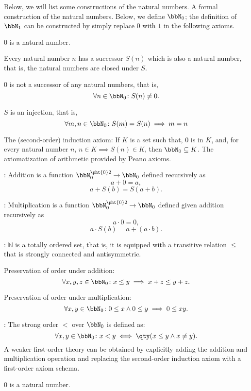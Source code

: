 \documentclass[a4paper,12pt]{report}
\begin{document}
\begin{itemizle}
Below, we will list some constructions of the natural numbers.
A formal construction of the natural numbers. Below, we define $\bbN_0$; the definition of $\bbN_1$ can be constructed by simply replace $0$ with $1$ in the following axioms.
\bit
\item $0$ is a natural number.
\item Every natural number $n$ has a successor $S(n)$ which is also a natural number, that is, the natural numbers are closed under $S$.
\item $0$ is not a successor of any natural numbers, that is,
\[\forall n\in\bbN_0\colon S(n)\neq 0.\]
\item $S$ is an injection, that is,
\[\forall m,n\in\bbN_0\colon S(m)=S(n)\implies m=n\]
\eit
\item The (second-order) induction axiom: If $K$ is a set such that, $0$ is in $K$, and, for every natural number $n$, $n\in K\implies S(n)\in K$, then $\bbN_0\subseteq K$.
\eit
{}
The axiomatization of arithmetic provided by Peano axioms.
\bit
\item {}: Addition is a function $\bbN_0^{\pht{0}2}\to\bbN_0$ defined recursively as
\[a+0=a,\]
\[a+S(b)=S(a+b).\]
\item {}: Multiplication is a function $\bbN_0^{\pht{0}2}\to\bbN_0$ defined given addition recursively as
\[a\cdot 0=0,\]
\[a\cdot S(b)=a+(a\cdot b).\]
\item {}: $\mathbb{N}$ is a totally ordered set, that is, it is equipped with a transitive relation $\leq$ that is strongly connected and antisymmetric.
\bit
\item Preservation of order under addition:
\[\forall x,y,z\in\bbN_0\colon x\leq y\implies x+z\leq y+z.\]
\item Preservation of order under multiplication:
\[\forall x,y\in\bbN_0\colon 0\leq x\land 0\leq y\implies 0\leq xy.\]
\eit
\item {}: The strong order $<$ over $\bbN_0$ is defined as:
\[\forall x,y\in\bbN_0\colon x<y\iff\qty(x\leq y\land x\neq y).\]
\eit
{}
A weaker first-order theory can be obtained by explicitly adding the addition and multiplication operation and replacing the second-order induction axiom with a first-order axiom schema.
\bit
\item $0$ is a natural number.

\end{itemizle}
\end{document}
